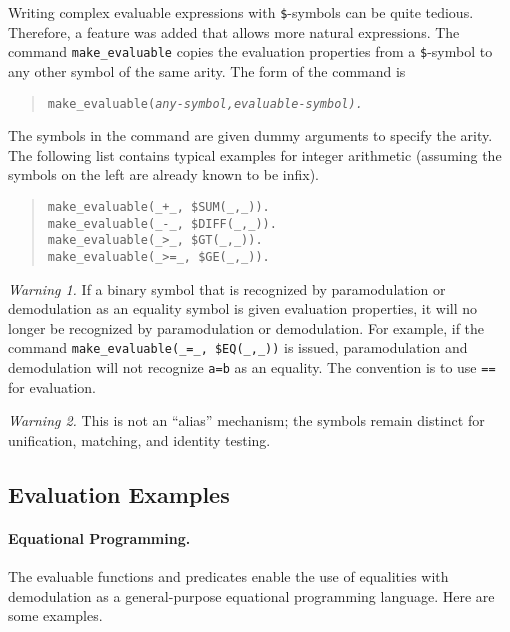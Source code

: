 \documentclass[11pt]{article}
\begin{document}
Writing complex evaluable expressions with \verb:$:-symbols can be
quite tedious. Therefore, a feature was added that allows more natural
expressions.  The command \verb:make_evaluable: copies the evaluation
properties from a \verb:$:-symbol to any other symbol of the same
arity.  The form of the command is
\begin{verse} \small
{\tt make\_evaluable(\em any-symbol\tt ,\em evaluable-symbol\tt ).}
\end{verse}
The symbols in the command are given dummy arguments to specify the
arity.  The following list contains typical examples for integer
arithmetic (assuming the symbols on the left are already known to be
infix).
\begin{verse} \small
\verb:make_evaluable(_+_, $SUM(_,_)).:\\
\verb:make_evaluable(_-_, $DIFF(_,_)).:\\
\verb:make_evaluable(_>_, $GT(_,_)).:\\
\verb:make_evaluable(_>=_, $GE(_,_)).:
\end{verse}
\noindent

\noindent
{\em Warning 1.}  If a binary symbol that is recognized by
paramodulation or demodulation as an equality symbol is
given evaluation properties, it will no longer be
recognized by paramodulation or demodulation.  For example,
if the command
\verb:make_evaluable(_=_, $EQ(_,_)):
is issued, paramodulation
and demodulation will not recognize \verb:a=b: as an equality.
The convention is to use \verb:==: for evaluation.

\noindent
{\em Warning 2.}  This is not an ``alias'' mechanism;
the symbols remain distinct for unification, matching,
and identity testing.

\subsection{Evaluation Examples} \label{eval-examples}

\paragraph{Equational Programming.}
The evaluable functions and predicates enable the use of equalities
with demodulation as a general-purpose equational programming
language.  Here are some examples.
\end{document}
